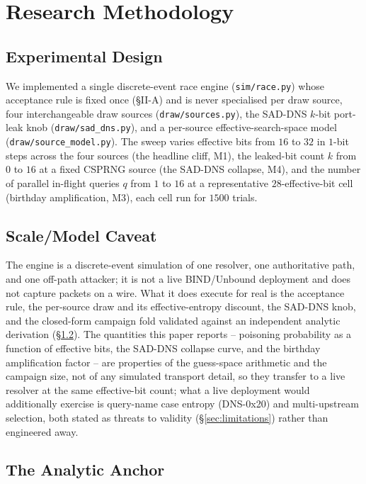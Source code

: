\documentclass[conference]{IEEEtran}
\begin{document}
\section{Research Methodology}

\subsection{Experimental Design}

We implemented a single discrete-event race engine (\texttt{sim/race.py}) whose acceptance rule is fixed
once (\S II-A) and is never specialised per draw source, four interchangeable draw sources
(\texttt{draw/sources.py}), the SAD-DNS $k$-bit port-leak knob (\texttt{draw/sad\_dns.py}), and a
per-source effective-search-space model (\texttt{draw/source\_model.py}). The sweep varies effective bits
from $16$ to $32$ in $1$-bit steps across the four sources (the headline cliff, M1), the leaked-bit count
$k$ from $0$ to $16$ at a fixed CSPRNG source (the SAD-DNS collapse, M4), and the number of parallel
in-flight queries $q$ from $1$ to $16$ at a representative $28$-effective-bit cell (birthday
amplification, M3), each cell run for $1500$ trials.

\subsection*{Scale/Model Caveat}
\label{sec:scalecaveat}
The engine is a discrete-event simulation of one resolver, one authoritative path, and one off-path
attacker; it is not a live BIND/Unbound deployment and does not capture packets on a wire. What it does
execute for real is the acceptance rule, the per-source draw and its effective-entropy discount, the
SAD-DNS knob, and the closed-form campaign fold validated against an independent analytic derivation
(\S\ref{sec:anchor}). The quantities this paper reports -- poisoning probability as a function of
effective bits, the SAD-DNS collapse curve, and the birthday amplification factor -- are properties of the
guess-space arithmetic and the campaign size, not of any simulated transport detail, so they transfer to a
live resolver at the same effective-bit count; what a live deployment would additionally exercise is
query-name case entropy (DNS-0x20) and multi-upstream selection, both stated as threats to validity
(\S\ref{sec:limitations}) rather than engineered away.

\subsection{The Analytic Anchor}
\label{sec:anchor}
\end{document}
